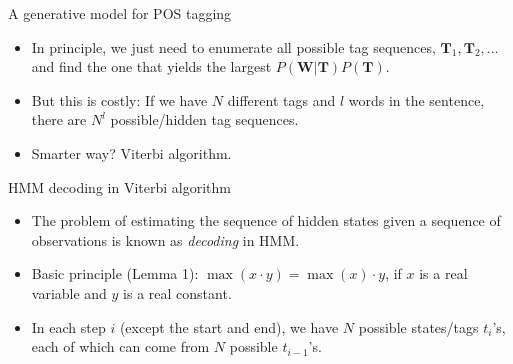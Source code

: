 \documentclass[11pt]{beamer}
\begin{document}
\begin{frame}{A generative model for POS tagging}
 \begin{itemize}[<+->]
  \item In principle, we just need to enumerate all possible tag sequences, $\mathbf{T}_1, \mathbf{T}_2, \dots$ and find the one that yields the largest  $P(\mathbf{W}|\mathbf{T}) P(\mathbf{T})$.
  \item But this is costly: If we have $N$ different tags and $l$ words in the sentence, there are $N^l$ possible/hidden tag sequences. 
  \item Smarter way? Viterbi algorithm. 
 \end{itemize}
\end{frame}

\begin{frame}[shrink]{HMM decoding in Viterbi algorithm}
\begin{itemize}[<+->]
 \item The problem of estimating the sequence of hidden states given a sequence of observations is known as \emph{decoding} in HMM. 
 \item Basic principle (Lemma 1): $\max(x\cdot y) = \max(x) \cdot y$,  if $x$ is a real variable and $y$ is a real constant. 
 \item In each step $i$ (except the start and end), we have $N$ possible states/tags $t_i$'s, each of which can come from $N$ possible $t_{i-1}$'s.  
  \end{itemize} 
\end{frame}
\end{document}
